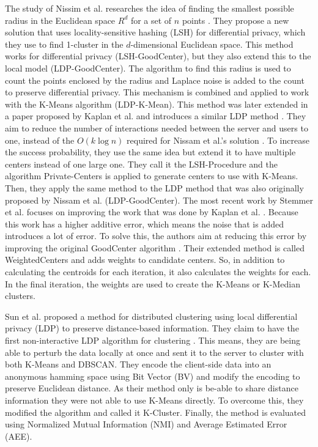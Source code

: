 The study of Nissim et al. researches the idea of finding the smallest possible radius in the Euclidean space  $R^d$ for a set of $n$ points \citep{nissim_clustering_2018}.
They propose a new solution that uses locality-sensitive hashing (LSH) for differential privacy, which they use to find 1-cluster in the $d$-dimensional Euclidean space.
This method works for differential privacy (LSH-GoodCenter), but they also extend this to the local model (LDP-GoodCenter).
The algorithm to find this radius is used to count the points enclosed by the radius and Laplace noise is added to the count to preserve differential privacy.
This mechanism is combined and applied to work with the K-Means algorithm (LDP-K-Mean).
This method was later extended in a paper proposed by Kaplan et al. and introduces a similar LDP method \citep{kaplan_differentially_2018}.
They aim to reduce the number of interactions needed between the server and users to one, instead of the $O(k\log n)$ required for Nissam et al.’s solution \citep{nissim_clustering_2018}.
To increase the success probability, they use the same idea but extend it to have multiple centers instead of one large one.
They call it the LSH-Procedure and the algorithm Private-Centers is applied to generate centers to use with K-Means.
Then, they apply the same method to the LDP method that was also originally proposed by Nissam et al. (LDP-GoodCenter).
The most recent work by Stemmer et al. focuses on improving the work that was done by Kaplan et al. \citep{kaplan_differentially_2018,stemmer_locally_2021}.
Because this work has a higher additive error, which means the noise that is added introduces a lot of error.
To solve this, the authors aim at reducing this error by improving the original GoodCenter algorithm \citep{nissim_clustering_2018}.
Their extended method is called WeightedCenters and adds weights to candidate centers.
So, in addition to calculating the centroids for each iteration, it also calculates the weights for each.
In the final iteration, the weights are used to create the K-Means or K-Median clusters.

Sun et al. proposed a method for distributed clustering using local differential privacy (LDP) to preserve distance-based information.
They claim to have the first non-interactive LDP algorithm for clustering \citep{sun_differentially_2019}.
This means, they are being able to perturb the data locally at once and sent it to the server to cluster with both K-Means and DBSCAN.
They encode the client-side data into an anonymous hamming space using Bit Vector (BV) and modify the encoding to preserve Euclidean distance.
As their method only is be-able to share distance information they were not able to use K-Means directly. To overcome this, they modified the algorithm and called it K-Cluster.
Finally, the method is evaluated using Normalized Mutual Information (NMI) and Average Estimated Error (AEE).

